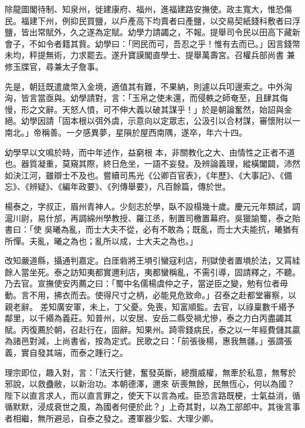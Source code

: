 \begin{pinyinscope}
 除龍圖閣待制、知泉州，徙建康府、福州，進福建路安撫使。政主寬大，惟恐傷民。福建下州，例抑民買鹽，以戶產高下均賣者曰產鹽，以交易契紙錢科敷者曰浮鹽，皆出常賦外，久之遂為定賦。幼學力請蠲之，不報。提舉司令民以田高下藏新會子，不如令者籍其貲。幼學曰：「罔民而可，吾忍之乎！惟有去而已。」因言錢幣未均，秤提無術，力求罷去。遂升寶謨閣直學士、提舉萬壽宮。召權兵部尚書
 兼修玉牒官，尋兼太子詹事。



 先是，朝廷既遣歲幣入金境，適值其有難，不果納，則遽以兵叩邊索之。中外洶洶，皆言當亟與。幼學請對，言：「玉帛之使未還，而侵軼之師奄至，且肆其侮慢，形之文辭。天怒人憤，可不伸大義以破其謀乎！」於是朝論奮然，始詔與金絕。幼學因請「固本根以弭外虞，示意向以定眾志，公汲引以合材謀，審懷附以一南北。」帝稱善。一夕感異夢，星隕於屋西南隅，遂卒，年六十四。



 幼學早以文鳴於時，而中年述作，益窮根
 本，非關教化之大、由情性之正者不道也。器質凝重，莫窺其際，終日危坐，一語不妄發。及辨論義理，縱橫闔闢，沛然如決江河，雖辯士不及也。嘗續司馬光《公卿百官表》，《年歷》、《大事記》、《備忘》、《辨疑》、《編年政要》、《列傳舉要》，凡百餘篇，傳於世。



 楊泰之，字叔正，眉州青神人。少刻志於學，臥不設榻幾十歲。慶元元年類試，調滬川尉，易什邡，再調綿州學教授、羅江丞，制置司檄置幕府。吳獵諭蜀，泰之貽書曰：「使
 吳曦為亂，而士大夫不從，必有不敢為；既亂，而士大夫能抗，曦猶有所憚。夫亂，曦之為也；亂所以成，士大夫之為也。」



 改知嚴道縣，攝通判嘉定。白厓砦將王塤引蠻寇利店，刑獄使者置塤於法，又罥絓餘人當坐死。泰之訪知夷都實邇利店，夷都蠻稱亂，不需引導，固請釋之，不聽。乃去官。宣撫使安丙薦之曰：「蜀中名儒楊虞仲之子，當逆臣之變，勉有位者毋動。言不用，拂衣而去。使得尺寸之柄，必能見危致命。」召泰之赴都堂審察，以親老辭。
 差知廣安軍，未上，丁父憂。免喪，知富順監。去官，以祿稟數千緡予鄰里，以千緡為義莊。知普州，以安居、安岳二縣受禍尤慘，泰之力白丙盡蠲其賦。丙復薦於朝，召赴行在，固辭。知果州。踦零錢病民，泰之以一年經費儲其贏為諸邑對減，上尚書省，按為定式。民歌之曰：「前張後楊，惠我無疆。」張謂張義，實自發其端，而泰之踵行之。



 理宗即位，趣入對，言：「法天行健，奮發英斷，總攬威權，無牽於私意，無奪於邪說，以救蠱敝，以新治功。本朝德澤，邇來
 斫喪無餘，民無恆心，何以為國？陛下以直言求人，而以直言罪之，使天下以言為戒。臣恐言路既梗，士氣益消，循循默默，浸成衰世之風，為國者何便於此？」上奇其對，以為工部郎中。其後言事者相繼，無所避忌，自泰之發之。遷軍器少監、大理少卿。




\end{pinyinscope}
